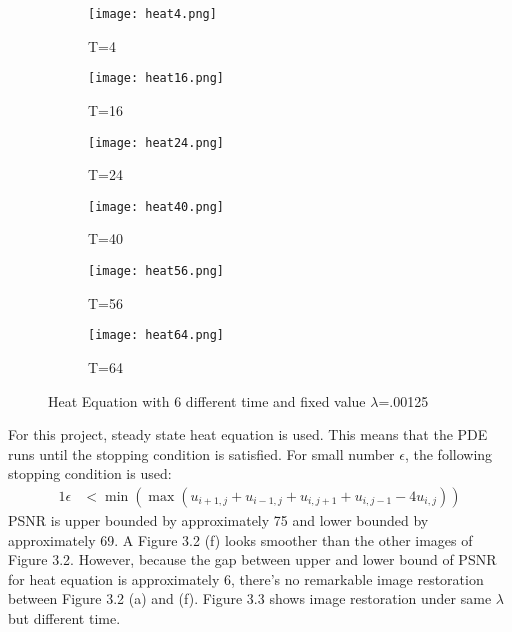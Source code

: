 \documentclass[12pt]{report}
\begin{document}
\begin{tableofcontents}
\begin{figure}[H]
\begin{subfigure}{0.325\textwidth}
					\texttt{[image: heat4.png]}
					\caption{T=4}
				\end{subfigure}
				\begin{subfigure}{0.325\textwidth}
					\texttt{[image: heat16.png]}
					\caption{T=16}
				\end{subfigure}
				\begin{subfigure}{0.325\textwidth}
					\texttt{[image: heat24.png]}
					\caption{T=24}
				\end{subfigure}
				\begin{subfigure}{0.325\textwidth}
					\texttt{[image: heat40.png]}
					\caption{T=40}
				\end{subfigure}
				\begin{subfigure}{0.325\textwidth}
					\texttt{[image: heat56.png]}
					\caption{T=56}
				\end{subfigure}
				\begin{subfigure}{0.325\textwidth}
					\texttt{[image: heat64.png]}
					\caption{T=64}
				\end{subfigure}
		\caption{Heat Equation with 6 different time and fixed value $\lambda$=.00125}
			\end{figure}
For this project, steady state heat equation is used. This means that the PDE runs until the stopping condition is satisfied. For small number $\epsilon$, the following stopping condition is used:
			\begin{alignat*}{1}
            \epsilon &< \min(\max(u_{i+1,j}+u_{i-1,j}+u_{i,j+1}+u_{i,j-1}-4u_{i,j}))
            \end{alignat*}
PSNR is upper bounded by approximately 75 and lower bounded by approximately 69. A Figure 3.2 (f) looks smoother than the other images of Figure 3.2. However, because the gap between upper and lower bound of PSNR for heat equation is approximately 6, there's no remarkable image restoration between Figure 3.2 (a) and (f). Figure 3.3 shows image restoration under same $\lambda$ but different time.

\end{tableofcontents}
\end{document}

